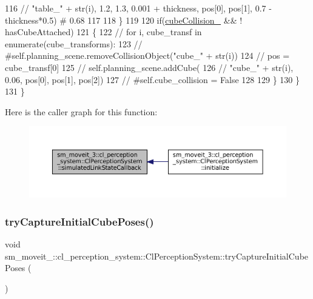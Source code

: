 \begin{DoxyCode}
116         \textcolor{comment}{//                 "table\_" + str(i), 1.2, 1.3, 0.001 + thickness, pos[0],  pos[1],  0.7 - 
       thickness*0.5)  # 0.68}
117 
118         \}
119 
120         \textcolor{keywordflow}{if}(\hyperlink{classsm__moveit__3_1_1cl__perception__system_1_1ClPerceptionSystem_a939dd657fa6c5e05ee171b2ec7daad1f}{cubeCollision\_} && ! hasCubeAttached)
121         \{
122         \textcolor{comment}{//         for i, cube\_transf in enumerate(cube\_transforms):}
123         \textcolor{comment}{//             #self.planning\_scene.removeCollisionObject("cube\_" + str(i))}
124         \textcolor{comment}{//             pos = cube\_transf[0]}
125         \textcolor{comment}{//             self.planning\_scene.addCube(}
126         \textcolor{comment}{//                 "cube\_" + str(i), 0.06, pos[0],  pos[1],  pos[2])}
127         \textcolor{comment}{//             #self.cube\_collision = False}
128 
129         \}
130       \}
131   \}
\end{DoxyCode}
Here is the caller graph for this function\+:
\nopagebreak
\begin{figure}[H]
\begin{center}
\leavevmode
\includegraphics[width=350pt]{classsm__moveit__3_1_1cl__perception__system_1_1ClPerceptionSystem_a540c3a50c29e6ec58f6fcd7e993d9dff_icgraph}
\end{center}
\end{figure}
\mbox{\label{classsm__moveit__3_1_1cl__perception__system_1_1ClPerceptionSystem_a211e752ccac5163bc775fa426c0d188d}} 
\subsubsection{\texorpdfstring{try\+Capture\+Initial\+Cube\+Poses()}{tryCaptureInitialCubePoses()}}
{\footnotesize\ttfamily void sm\+\_\+moveit\+\_\+::cl\+\_\+perception\+\_\+system\+::\+Cl\+Perception\+System\+::try\+Capture\+Initial\+Cube\+Poses (\begin{DoxyParamCaption}{ }\end{DoxyParamCaption})\hspace{0.3cm}{\ttfamily [inline]}}



